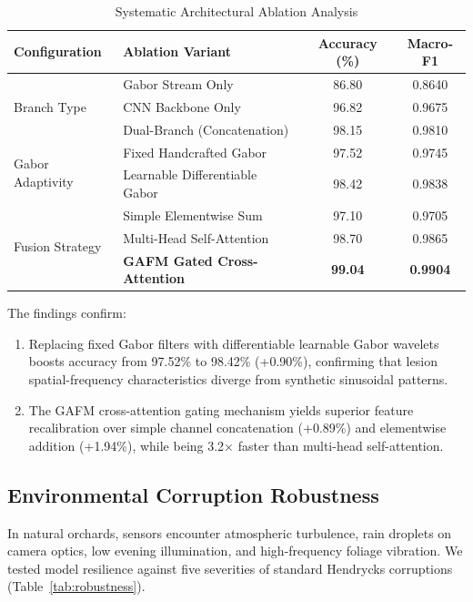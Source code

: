 \documentclass[journal]{IEEEtran}
\begin{document}
\begin{table}[t]
\centering
\caption{Systematic Architectural Ablation Analysis}
\label{tab:ablation}
\begin{tabular}{llcc}
\toprule
\textbf{Configuration} & \textbf{Ablation Variant} & \textbf{Accuracy (\%)} & \textbf{Macro-F1} \\
\midrule
\multirow{3}{*}{Branch Type} & Gabor Stream Only & 86.80 & 0.8640 \\
 & CNN Backbone Only & 96.82 & 0.9675 \\
 & Dual-Branch (Concatenation) & 98.15 & 0.9810 \\
\midrule
\multirow{2}{*}{Gabor Adaptivity} & Fixed Handcrafted Gabor & 97.52 & 0.9745 \\
 & Learnable Differentiable Gabor & 98.42 & 0.9838 \\
\midrule
\multirow{3}{*}{Fusion Strategy} & Simple Elementwise Sum & 97.10 & 0.9705 \\
 & Multi-Head Self-Attention & 98.70 & 0.9865 \\
 & \textbf{GAFM Gated Cross-Attention} & \textbf{99.04} & \textbf{0.9904} \\
\bottomrule
\end{tabular}
\end{table}

The findings confirm:
\begin{enumerate}
    \item Replacing fixed Gabor filters with differentiable learnable Gabor wavelets boosts accuracy from 97.52\% to 98.42\% (+0.90\%), confirming that lesion spatial-frequency characteristics diverge from synthetic sinusoidal patterns.
    \item The GAFM cross-attention gating mechanism yields superior feature recalibration over simple channel concatenation (+0.89\%) and elementwise addition (+1.94\%), while being 3.2$\times$ faster than multi-head self-attention.
\end{enumerate}

\subsection{Environmental Corruption Robustness}
In natural orchards, sensors encounter atmospheric turbulence, rain droplets on camera optics, low evening illumination, and high-frequency foliage vibration. We tested model resilience against five severities of standard Hendrycks corruptions \cite{hendrycks2019benchmarking} (Table~\ref{tab:robustness}).
\end{document}
